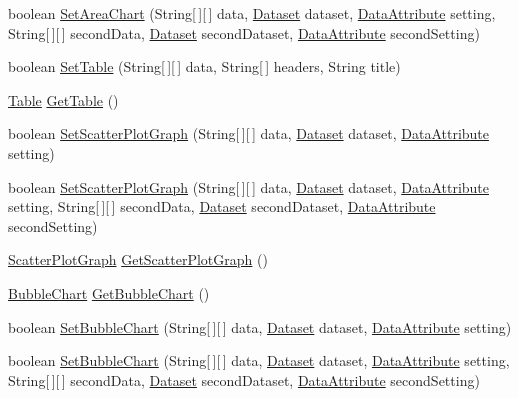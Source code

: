 \begin{DoxyCompactItemize}
\item 
boolean \hyperlink{class_visualisation_ac427704ed5a25c91288a84cc22423c1e}{Set\-Area\-Chart} (String\mbox{[}$\,$\mbox{]}\mbox{[}$\,$\mbox{]} data, \hyperlink{class_dataset}{Dataset} dataset, \hyperlink{class_data_attribute}{Data\-Attribute} setting, String\mbox{[}$\,$\mbox{]}\mbox{[}$\,$\mbox{]} second\-Data, \hyperlink{class_dataset}{Dataset} second\-Dataset, \hyperlink{class_data_attribute}{Data\-Attribute} second\-Setting)
\item 
boolean \hyperlink{class_visualisation_a88364e751603135b03174ef4c80e7476}{Set\-Table} (String\mbox{[}$\,$\mbox{]}\mbox{[}$\,$\mbox{]} data, String\mbox{[}$\,$\mbox{]} headers, String title)
\item 
\hyperlink{class_table}{Table} \hyperlink{class_visualisation_a9ec8f3e76d11a584fa6431cf474a309d}{Get\-Table} ()
\item 
boolean \hyperlink{class_visualisation_a3cd7ab25612c57d24a262e4423567b89}{Set\-Scatter\-Plot\-Graph} (String\mbox{[}$\,$\mbox{]}\mbox{[}$\,$\mbox{]} data, \hyperlink{class_dataset}{Dataset} dataset, \hyperlink{class_data_attribute}{Data\-Attribute} setting)
\item 
boolean \hyperlink{class_visualisation_a02429915c1c0e69d646b330bfc79b6c1}{Set\-Scatter\-Plot\-Graph} (String\mbox{[}$\,$\mbox{]}\mbox{[}$\,$\mbox{]} data, \hyperlink{class_dataset}{Dataset} dataset, \hyperlink{class_data_attribute}{Data\-Attribute} setting, String\mbox{[}$\,$\mbox{]}\mbox{[}$\,$\mbox{]} second\-Data, \hyperlink{class_dataset}{Dataset} second\-Dataset, \hyperlink{class_data_attribute}{Data\-Attribute} second\-Setting)
\item 
\hyperlink{class_scatter_plot_graph}{Scatter\-Plot\-Graph} \hyperlink{class_visualisation_a5d81fc2ce8516e8082f731070479a8ef}{Get\-Scatter\-Plot\-Graph} ()
\item 
\hyperlink{class_bubble_chart}{Bubble\-Chart} \hyperlink{class_visualisation_a411c788977dfa62440d678421f6a3a2f}{Get\-Bubble\-Chart} ()
\item 
boolean \hyperlink{class_visualisation_a531a5d825d0a2fc22d36a84b4e1f563d}{Set\-Bubble\-Chart} (String\mbox{[}$\,$\mbox{]}\mbox{[}$\,$\mbox{]} data, \hyperlink{class_dataset}{Dataset} dataset, \hyperlink{class_data_attribute}{Data\-Attribute} setting)
\item 
boolean \hyperlink{class_visualisation_a7faa85814bee64ecdde35258b810f7da}{Set\-Bubble\-Chart} (String\mbox{[}$\,$\mbox{]}\mbox{[}$\,$\mbox{]} data, \hyperlink{class_dataset}{Dataset} dataset, \hyperlink{class_data_attribute}{Data\-Attribute} setting, String\mbox{[}$\,$\mbox{]}\mbox{[}$\,$\mbox{]} second\-Data, \hyperlink{class_dataset}{Dataset} second\-Dataset, \hyperlink{class_data_attribute}{Data\-Attribute} second\-Setting)

\end{DoxyCompactItemize}
